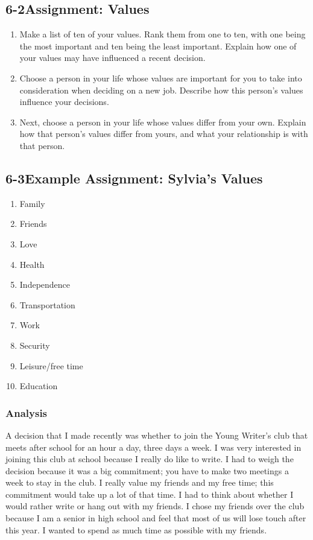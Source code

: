 \pagebreak \subsection*{6-2\quad Assignment: Values}
\begin{enumerate}[leftmargin=*]
\item Make a list of ten of your values. Rank them from one to ten, with one being the most important and ten being the least important.
Explain how one of your values may have influenced a recent decision.
\item Choose a person in your life whose values are important for you to take into consideration when deciding on a new job. Describe how this person's values influence your decisions.
\item Next, choose a person in your life whose values differ from your own. Explain how that person's values differ from yours, and what your relationship is with that person.
\end{enumerate}
\pagebreak \subsection*{6-3\quad Example Assignment: Sylvia's Values}

\begin{multicols}{2}
\begin{enumerate}[leftmargin=*]
\item Family
\item Friends
\item Love
\item Health
\item Independence
\item Transportation
\item Work
\item Security
\item Leisure/free time
\item Education
\end{enumerate} \end{multicols}
\subsubsection*{Analysis}
A decision that I made recently was whether to join the Young Writer's club that meets after school for an hour a day, three days a week. I was very interested in joining this club at school because I really do like to write. I had to weigh the decision because it was a big commitment; you have to make two meetings a week to stay in the club. I really value my friends and my free time; this commitment would take up a lot of that time. I had to think about whether I would rather write or hang out with my friends. I chose my friends over the club because I am a senior in high school and feel that most of us will lose touch after this year. I wanted to spend as much time as possible with my friends.

